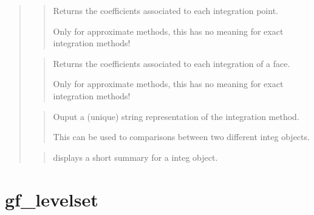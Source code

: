 \documentclass[a4paper,11pt,english]{sphinxmanual}
\begin{document}
\begin{quote}
\sphinxAtStartPar
{}
\begin{quote}

\sphinxAtStartPar
Returns the coefficients associated to each integration point.

\sphinxAtStartPar
Only for approximate methods, this has no meaning for exact
integration methods!
\end{quote}

\sphinxAtStartPar
{}
\begin{quote}

\sphinxAtStartPar
Returns the coefficients associated to each integration of a face.

\sphinxAtStartPar
Only for approximate methods, this has no meaning for exact
integration methods!
\end{quote}

\sphinxAtStartPar
{}
\begin{quote}

\sphinxAtStartPar
Ouput a (unique) string representation of the integration method.

\sphinxAtStartPar
This can be used to  comparisons between two different integ
objects.
\end{quote}

\sphinxAtStartPar
{}
\begin{quote}

\sphinxAtStartPar
displays a short summary for a integ object.
\end{quote}
\end{quote}


\section{gf\_levelset}
\label{\detokenize{matlab_octave/cmdref_gf_levelset:gf-levelset}}\label{\detokenize{matlab_octave/cmdref_gf_levelset::doc}}
\sphinxAtStartPar
{}

\begin{sphinxVerbatim}[commandchars=\\\{\}]
     \PYG{p}{[}    \PYG{p}{[}     \PYG{p}{]}\PYG{p}{]}
\end{sphinxVerbatim}
\end{document}
